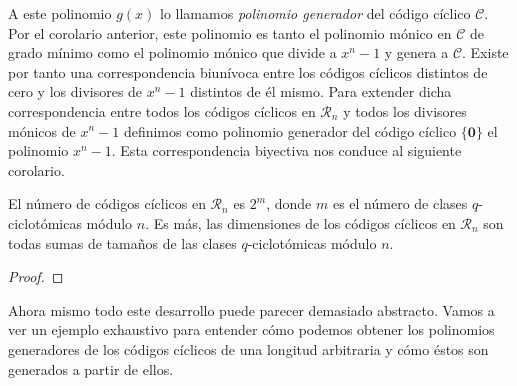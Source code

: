 A este polinomio \(g(x)\) lo llamamos \textit{polinomio generador} del código cíclico \(\mathcal C\).
Por el corolario anterior, este polinomio es tanto el polinomio mónico en \(\mathcal C\) de grado mínimo como el polinomio mónico que divide a \(x^n - 1\) y genera a \(\mathcal C\).
Existe por tanto una correspondencia biunívoca entre los códigos cíclicos distintos de cero y los divisores de \(x^n - 1\) distintos de él mismo.
Para extender dicha correspondencia entre todos los códigos cíclicos en \(\mathcal R_n\) y todos los divisores mónicos de \(x^n - 1\) definimos como polinomio generador del código cíclico \(\{\mathbf 0\}\) el polinomio \(x^n - 1\). 
Esta correspondencia biyectiva nos conduce al siguiente corolario.

\begin{corollary}
  El número de códigos cíclicos en \(\mathcal R_n\) es \(2^m\), donde \(m\) es el número de clases \(q\)-ciclotómicas módulo \(n\).
  Es más, las dimensiones de los códigos cíclicos en \(\mathcal R_n\) son todas sumas de tamaños de las clases \(q\)-ciclotómicas módulo \(n\).
\end{corollary}

\begin{proof}
\end{proof}

Ahora mismo todo este desarrollo puede parecer demasiado abstracto.
Vamos a ver un ejemplo exhaustivo para entender cómo podemos obtener los polinomios generadores de los códigos cíclicos de una longitud arbitraria y cómo éstos son generados a partir de ellos.

